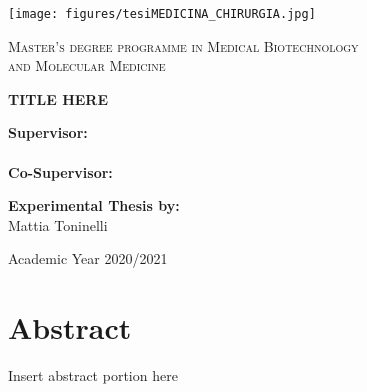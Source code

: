 \documentclass[a4paper, 13pt, oneside]{report}
\begin{document}
\begin{titlepage} %

\begin{center}
	\texttt{[image: figures/tesiMEDICINA\_CHIRURGIA.jpg]}\par
	\vspace{1cm}
	{\scshape\large Master's degree programme in Medical Biotechnology \\ and Molecular Medicine\par}
	\vspace{4cm}
	{\schape\large\bfseries TITLE HERE\par}
	\vspace{4cm}
	\end{center}
	
	\begin{multicols}{2}
	\begin{center}
	 	{
                  \schape\normalsize\textbf{Supervisor:}\\ \\
                 \schape\normalsize\textbf{Co-Supervisor:}\\ \par}
	\vfill
	\schape\normalsize\textbf{Experimental Thesis by:}\\Mattia Toninelli\\ \par 
	\end{center}
	\end{multicols}
	
	\vfill

	{\begin{center}
	     \schape\large Academic Year 2020/2021
	\end{center}}

\end{titlepage}

\section{Abstract}
Insert abstract portion here    

\tableofcontents

%
%

\printbibliography

\medskip

\
\end{document}
